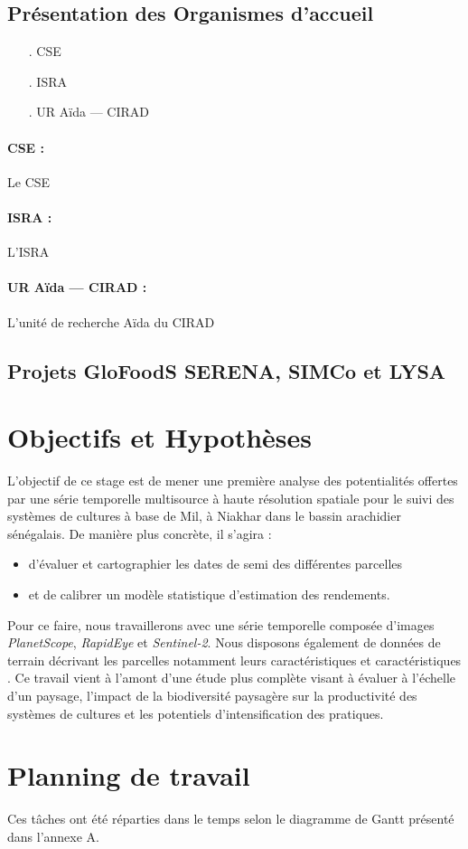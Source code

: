   \subsection{Présentation des Organismes d'accueil}
  
  \begin{itemize}
   \item[.] CSE 
   \item[.] ISRA
   \item[.] UR Aïda --- CIRAD
  \end{itemize}

  
    \paragraph{CSE :}
    
    Le CSE
    
    \paragraph{ISRA :}
    
    L'ISRA 
    
    \paragraph{UR Aïda --- CIRAD :}
    
    L'unité de recherche Aïda du CIRAD 
  
  \subsection{Projets GloFoodS SERENA, SIMCo et LYSA}

\section{Objectifs et Hypothèses}

L'objectif de ce stage est de mener une première analyse des potentialités offertes par une série temporelle multisource à haute résolution spatiale pour le suivi des systèmes 
de cultures à base de Mil, à Niakhar dans le bassin arachidier sénégalais. De manière plus concrète, il s'agira :
\begin{itemize}
   \item d'évaluer et cartographier les dates de semi des différentes parcelles
   \item et de calibrer un modèle statistique d'estimation des rendements.
  \end{itemize}
Pour ce faire, nous travaillerons avec une série temporelle composée d'images \emph{PlanetScope}, \emph{RapidEye} et \emph{Sentinel-2}. Nous disposons également de données de terrain décrivant les 
parcelles notamment leurs caractéristiques et caractéristiques .
Ce travail vient à l'amont d'une étude plus complète visant à évaluer à l’échelle d’un paysage, l’impact de la biodiversité paysagère sur la productivité des systèmes de cultures 
et les potentiels d’intensification des pratiques.

\section{Planning de travail}

Ces tâches ont été réparties dans le temps selon le diagramme de Gantt présenté dans l'annexe A.